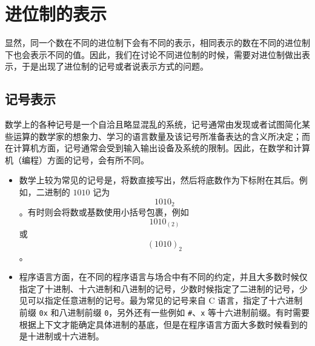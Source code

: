 \section{进位制的表示}\label{sec:NumberSystemBasics/PositionalNotationPresentation}
    显然，同一个数在不同的进位制下会有不同的表示，相同表示的数在不同的进位制下也会表示不同的值。因此，我们在讨论不同进位制的时候，需要对进位制做出表示，于是出现了进位制的记号或者说表示方式的问题。
    \subsection{记号表示}\label{subsec:NumberSystemBasics/PositionalNotationPresentation/Natural}
        数学上的各种记号是一个自洽且略显混乱的系统，记号通常由发现或者试图简化某些运算的数学家的想象力、学习的语言数量及该记号所准备表达的含义所决定；而在计算机方面，记号通常会受到输入输出设备及系统的限制。因此，在数学和计算机（编程）方面的记号，会有所不同。
        \begin{itemize}
            \item 数学上较为常见的记号是，将数直接写出，然后将底数作为下标附在其后。例如，二进制的 $1010$ 记为 \[1010_2\]。有时则会将数或基数使用小括号包裹，例如 \[1010_{(2)}\] 或 \[(1010)_2\]。
            \item 程序语言方面，在不同的程序语言与场合中有不同的约定，并且大多数时候仅指定了十进制、十六进制和八进制的记号，少数时候指定了二进制的记号，少见可以指定任意进制的记号。最为常见的记号来自 C 语言，指定了十六进制前缀 \texttt{0x} 和八进制前缀 \texttt{0}，另外还有一些例如 \texttt{\#}、\texttt{x} 等十六进制前缀。有时需要根据上下文才能确定具体进制的基底，但是在程序语言方面大多数时候看到的是十进制或十六进制。
        \end{itemize}
